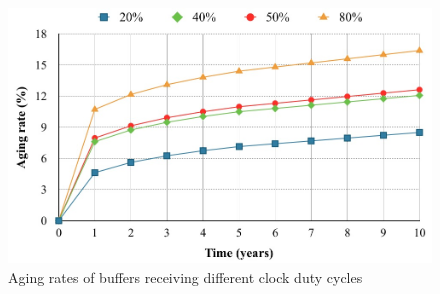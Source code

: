 \begin{figure}
    \centering
    \includegraphics[width=0.65\columnwidth]{agr.png} %
    \caption{Aging rates of buffers receiving different clock duty cycles}
    \label{fig:agr}
\end{figure}
